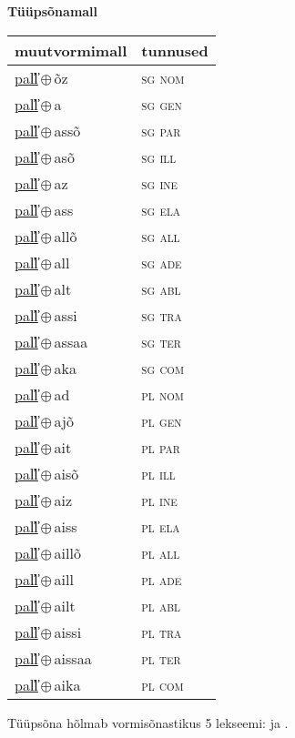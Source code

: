 

\vspace{3.5em}
\noindent \begin{minipage}{\textwidth}
\noindent \textbf{Tüüpsõnamall \,}\\

\begin{sideways}
\begin{tabular}{l l}
muutvormimall & tunnused \\
\hline
\underline{pal̕l̕}\,$\oplus$\,õz & \textsc{ sg nom } \\
\underline{pal̕l̕}\,$\oplus$\,a & \textsc{ sg gen } \\
\underline{pal̕l̕}\,$\oplus$\,assõ & \textsc{ sg par } \\
\underline{pal̕l̕}\,$\oplus$\,asõ & \textsc{ sg ill } \\
\underline{pal̕l̕}\,$\oplus$\,az & \textsc{ sg ine } \\
\underline{pal̕l̕}\,$\oplus$\,ass & \textsc{ sg ela } \\
\underline{pal̕l̕}\,$\oplus$\,allõ & \textsc{ sg all } \\
\underline{pal̕l̕}\,$\oplus$\,all & \textsc{ sg ade } \\
\underline{pal̕l̕}\,$\oplus$\,alt & \textsc{ sg abl } \\
\underline{pal̕l̕}\,$\oplus$\,assi & \textsc{ sg tra } \\
\underline{pal̕l̕}\,$\oplus$\,assaa & \textsc{ sg ter } \\
\underline{pal̕l̕}\,$\oplus$\,aka & \textsc{ sg com } \\
\underline{pal̕l̕}\,$\oplus$\,ad & \textsc{ pl nom } \\
\underline{pal̕l̕}\,$\oplus$\,ajõ & \textsc{ pl gen } \\
\underline{pal̕l̕}\,$\oplus$\,ait & \textsc{ pl par } \\
\underline{pal̕l̕}\,$\oplus$\,aisõ & \textsc{ pl ill } \\
\underline{pal̕l̕}\,$\oplus$\,aiz & \textsc{ pl ine } \\
\underline{pal̕l̕}\,$\oplus$\,aiss & \textsc{ pl ela } \\
\underline{pal̕l̕}\,$\oplus$\,aillõ & \textsc{ pl all } \\
\underline{pal̕l̕}\,$\oplus$\,aill & \textsc{ pl ade } \\
\underline{pal̕l̕}\,$\oplus$\,ailt & \textsc{ pl abl } \\
\underline{pal̕l̕}\,$\oplus$\,aissi & \textsc{ pl tra } \\
\underline{pal̕l̕}\,$\oplus$\,aissaa & \textsc{ pl ter } \\
\underline{pal̕l̕}\,$\oplus$\,aika & \textsc{ pl com } \\
\end{tabular}
\end{sideways}
\label{tab:tüüpsõnamall-pal̕l̕õz}

\end{minipage}

 
\vspace{1em}
\noindent Tüüpsõna hõlmab vormisõnastikus 5 lekseemi:  ja .
